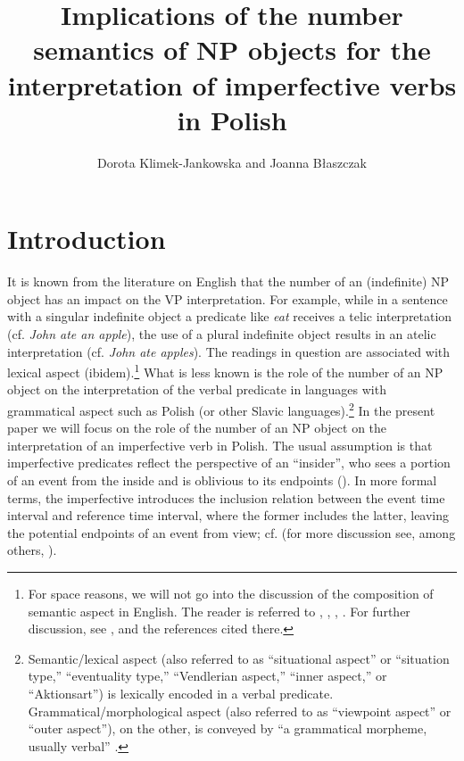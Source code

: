 \documentclass[output=paper]{langscibook}
\author{Dorota Klimek-Jankowska\affiliation{University of Wrocław} and Joanna Błaszczak\affiliation{University of Wrocław}}
\title[Number semantics and the interpretation of imperfective verbs in Polish]{Implications of the number semantics of NP objects for the interpretation of imperfective verbs in Polish}
\begin{document}
\maketitle

\section{Introduction}\label{jan-bla:fansb:kb:sec1}

It is known from the literature on English that the number of an (indefinite) NP object has an impact on the VP interpretation. For example, while in a sentence with a singular indefinite object a predicate like \textit{eat} receives a telic interpretation (cf. \textit{John ate an apple}), the use of a plural indefinite object results in an atelic interpretation (cf. \textit{John ate apples}). The readings in question are associated with lexical aspect (ibidem).\footnote{For space reasons, we will not go into the discussion of the composition of semantic aspect in English. The reader is referred to \citet{Filip1994}, \citet{Krifka1989,Krifka1992,Krifka1998}, \citet{Rothstein2004}, \citet{Verkuyl1972,Verkuyl1993,Verkuyl1999}. For further discussion, see \citet{Dowty1979,MacDonald2008,Tenny1994,Willim2006}, and the references cited there.} What is less known is the role of the number of an NP object on the interpretation of the verbal predicate in languages with grammatical aspect such as Polish (or other Slavic languages).\footnote{Semantic/lexical aspect (also referred to as “situational aspect” or “situation type,” “eventuality type,” “Vendlerian aspect,” “inner aspect,” or “Aktionsart”) is lexically encoded in a verbal predicate. Grammatical/morphological aspect (also referred to as “viewpoint aspect” or “outer aspect”), on the other, is conveyed by “a grammatical morpheme, usually verbal” \citep[2]{Smith1997}.} In the present paper we will focus on the role of the number of an NP object on the interpretation of an imperfective verb in Polish. The usual assumption is that imperfective predicates reflect the perspective of an ``insider'', who sees a portion of an event from the inside and is oblivious to its endpoints (\citealt{KazaninaandPhillips2003}). In more formal terms, the imperfective introduces the inclusion relation between the event time interval and reference time interval, where the former includes the latter, leaving the potential endpoints of an event from view; cf.  (for more discussion see, among others, \citealt{Borik20022006,Comrie1976,KampandReyle1993,Klein1994,Reichenbach1947,Smith1997}).
\end{document}

